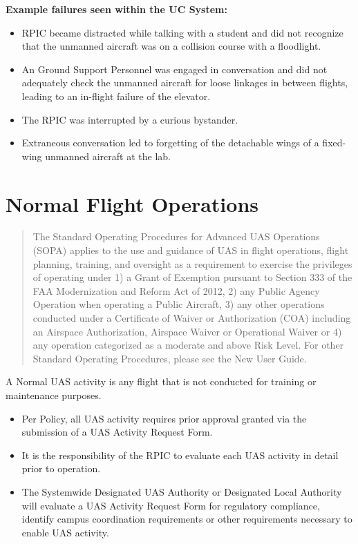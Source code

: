 \documentclass[
]{book}
\providecommand{\tightlist}{%
  \setlength{\itemsep}{0pt}\setlength{\parskip}{0pt}}
\begin{document}
\textbf{Example failures seen within the UC System:}

\begin{itemize}
\tightlist
\item
  RPIC became distracted while talking with a student and did not recognize that the unmanned aircraft was on a collision course with a floodlight.
\item
  An Ground Support Personnel was engaged in conversation and did not adequately check the unmanned aircraft for loose linkages in between flights, leading to an in-flight failure of the elevator.
\item
  The RPIC was interrupted by a curious bystander.
\item
  Extraneous conversation led to forgetting of the detachable wings of a fixed-wing unmanned aircraft at the lab.
\end{itemize}

\hypertarget{normal-flight-operations}{%
\chapter{Normal Flight Operations}\label{normal-flight-operations}}

\begin{quote}
The Standard Operating Procedures for Advanced UAS Operations (SOPA) applies to the use and guidance of UAS in flight operations, flight planning, training, and oversight as a requirement to exercise the privileges of operating under 1) a Grant of Exemption pursuant to Section 333 of the FAA Modernization and Reform Act of 2012, 2) any Public Agency Operation when operating a Public Aircraft, 3) any other operations conducted under a Certificate of Waiver or Authorization (COA) including an Airspace Authorization, Airspace Waiver or Operational Waiver or 4) any operation categorized as a moderate and above Risk Level. For other Standard Operating Procedures, please see the New User Guide.
\end{quote}

A Normal UAS activity is any flight that is not conducted for training or maintenance purposes.

\begin{itemize}
\tightlist
\item
  Per Policy, all UAS activity requires prior approval granted via the submission of a UAS Activity Request Form.
\item
  It is the responsibility of the RPIC to evaluate each UAS activity in detail prior to operation.
\item
  The Systemwide Designated UAS Authority or Designated Local Authority will evaluate a UAS Activity Request Form for regulatory compliance, identify campus coordination requirements or other requirements necessary to enable UAS activity.
\end{itemize}
\end{document}
